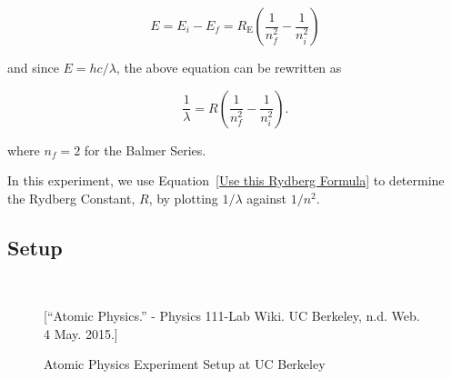 \begin{equation} 
    E=E_i-E_f=R_\mathrm{E} \left( \frac{1}{n_{f}^2} - \frac{1}{n_{i}^2} \right) \,
  \label{Rydberg Forumla}
\end{equation}

and since $ E = hc / \lambda $, the above equation can be rewritten as 

\begin{equation} 
    \frac{1}{\lambda}=R \left( \frac{1}{n_{f}^2} - \frac{1}{n_{i}^2} \right). \,
  \label{Use this Rydberg Formula}
\end{equation}

where $n_{f} = 2$ for the Balmer Series.

In this experiment, we use Equation~\ref{Use this Rydberg Formula} to determine the Rydberg Constant, $R$, by plotting $1 / \lambda$ against $1 / n^{2} $.

\subsection{Setup}

\begin{figure}[ht]
  \begin{center}
     \\
  \end{center}
  \caption{Atomic Physics Experiment Setup at UC Berkeley}[\footnotesize{``Atomic Physics.'' - Physics 111-Lab Wiki. UC Berkeley, n.d. Web. 4 May. 2015.}]
  \label{ThreeFigs}
\end{figure}

